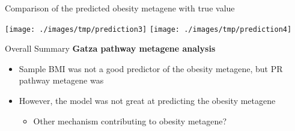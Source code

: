 \documentclass[handout]{beamer}
\begin{document}
\begin{frame}{\normalsize Comparison of the predicted obesity metagene with true value}
	\begin{center}
		\texttt{[image: ./images/tmp/prediction3]}
		\texttt{[image: ./images/tmp/prediction4]}
	\end{center}
\end{frame}


\begin{frame}{Overall Summary}
	\textbf{Gatza pathway metagene analysis}
	\begin{itemize}
		\item Sample BMI was not a good predictor of the obesity metagene, but PR pathway metagene was
		\item However, the model was not great at predicting the obesity metagene
			\begin{itemize}
				\item Other mechanism contributing to obesity metagene?
			\end{itemize}
	\end{itemize}
\end{frame}

\end{document}
